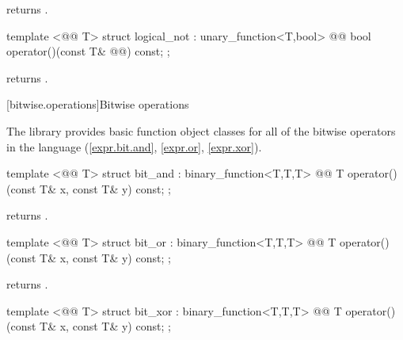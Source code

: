 \documentclass[american,twoside]{book}
\begin{document}
\begin{itemdescr}
\pnum
{} returns .
\end{itemdescr}

%
\begin{itemdecl}
template <@@ T> struct logical_not : unary_function<T,bool> {
  @@
    bool operator()(const T& @@) const;
};
\end{itemdecl}

\begin{itemdescr}
\pnum
{} returns .
\end{itemdescr}

[bitwise.operations]{Bitwise operations}

\pnum
The library provides basic function object classes for all of the bitwise
operators in the language (\ref{expr.bit.and}, \ref{expr.or}, \ref{expr.xor}).

%
\begin{itemdecl}
template <@@ T> struct bit_and : binary_function<T,T,T> {
  @@
    T operator()(const T& x, const T& y) const;
};
\end{itemdecl}

\begin{itemdescr}
\pnum
{} returns .
\end{itemdescr}

%
\begin{itemdecl}
template <@@ T> struct bit_or : binary_function<T,T,T> {
  @@
    T operator()(const T& x, const T& y) const;
};
\end{itemdecl}

\begin{itemdescr}
\pnum
{} returns .
\end{itemdescr}

%
\begin{itemdecl}
template <@@ T> struct bit_xor : binary_function<T,T,T> {
  @@
    T operator()(const T& x, const T& y) const;
};
\end{itemdecl}
\end{document}
